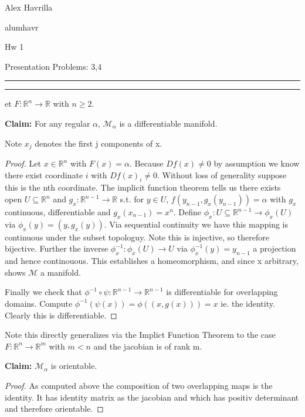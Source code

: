 \documentclass[11pt]{article}
\newcommand{\R}{\mathbb{R}}
\newcommand{\m}{\mathcal{M}}
\newcommand{\question}[2] {\vspace{.25in} \hrule\vspace{0.5em}
\noindent{\bf #1: #2} \vspace{0.5em}
\hrule \vspace{.10in}}
\newcommand{\myname}{Alex Havrilla}
\newcommand{\myandrew}{alumhavr}
\newcommand{\myhwnum}{Hw 1}
\begin{document}
\medskip                        

\thispagestyle{plain}
\begin{center}

{\myname}

\myandrew

\myhwnum

\end{center}

Presentation Problems: 3,4


\question{Question 1}

Let $F : \R^n \to \R$ with $n\geq 2$. 

\textbf{Claim:} For any regular $\alpha$, $\mathcal{M}_{\alpha}$ is a differentiable manifold.

Note $x_j$ denotes the first j components of x.

\begin{proof}

Let $x \in \R^n$ with $F(x) = \alpha$. Because $Df(x) \neq 0$ by assumption we know there exist coordinate $i$ with $Df(x)_i \neq 0$. Without loss of generality suppose this is the nth coordinate. The implicit function theorem tells us there exists open $U \subseteq \R^n$ and $g_x : \R^{n-1} \to \R$ s.t. for $y \in U$, $f(y_{n-1},g_x(y_{n-1})) = \alpha$ with $g_x$ continuous, differentiable and $g_x(x_{n-1}) = x^n$. Define $\phi_x : U \subseteq \R^{n-1} \to \phi_x(U)$ via $\phi_x(y) = (y,g_x(y))$. Via sequential continuity we have this mapping is continuous under the subset topologuy. Note this is injective, so therefore bijective. Further the inverse $\phi_x^{-1} : \phi_x(U) \to U$ via $\phi_x^{-1}(y) = y_{n-1}$ a projection and hence continouous. This establishes a homeomorphism, and since x arbitrary, shows $\m$ a manifold.

Finally we check that $\phi^{-1}\circ \psi : \R^{n-1} \to \R^{n-1}$ is differentiable for overlapping domains. Compute $\phi^{-1}(\psi(x)) = \phi((x,g(x))) = x$ ie. the identity. Clearly this is differentiable.

\end{proof}

Note this directly generalizes via the Implict Function Theorem to the case $F: \R^n \to \R^m$ with $m < n$ and the jacobian is of rank m. 

\textbf{Claim:} $\mathcal{M}_{\alpha}$ is orientable.

\begin{proof}

As computed above the composition of two overlapping maps is the identity. It has identity matrix as the jacobian and which has positiv determinant and therefore orientable.

\end{proof}
\end{document}
